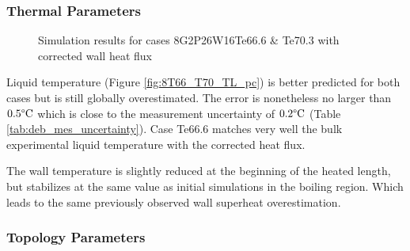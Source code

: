 \subsubsection{Thermal Parameters}

\begin{figure}[!h]
\centering
{}
\caption{Simulation results for cases 8G2P26W16Te66.6 \& Te70.3 with corrected wall heat flux}
\label{fig:deb_cfd_8T66_T70_pc}
\end{figure}

\npar

Liquid temperature (Figure \ref{fig:8T66_T70_TL_pc}) is better predicted for both cases but is still globally overestimated. The error is nonetheless no larger than $0.5\degree\mathrm{C}$ which is close to the measurement uncertainty of $0.2\degree\mathrm{C}$ (Table \ref{tab:deb_mes_uncertainty}). Case Te66.6 matches very well the bulk experimental liquid temperature with the corrected heat flux.

\npar

The wall temperature is slightly reduced at the beginning of the heated length, but stabilizes at the same value as initial simulations in the boiling region. Which leads to the same previously observed wall superheat overestimation.


\subsubsection{Topology Parameters}


